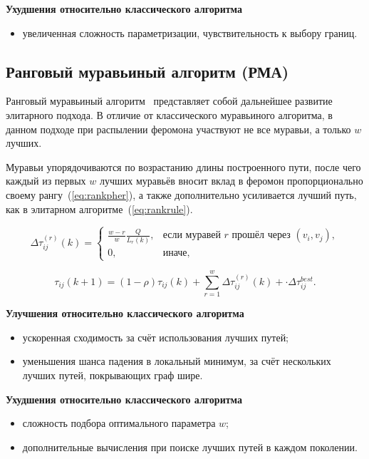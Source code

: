 \textbf{Ухудшения относительно классического алгоритма}

\begin{itemize}
	\item увеличенная сложность параметризации, чувствительность к выбору границ.
\end{itemize} 

\subsection*{Ранговый муравьиный алгоритм (РМА)}

Ранговый муравьиный алгоритм~\cite{rbas} представляет собой дальнейшее развитие элитарного подхода. В отличие от классического муравьиного алгоритма, в данном подходе при распылении феромона участвуют не все муравьи, а только $w$ лучших.

Муравьи упорядочиваются по возрастанию длины построенного пути, после чего каждый из первых $w$ лучших муравьёв вносит вклад в феромон пропорционально своему рангу~(\ref{eq:rankpher}), а также дополнительно усиливается лучший путь, как в элитарном алгоритме~(\ref{eq:rankrule}).

\begin{equation}
	\Delta \tau_{ij}^{(r)}(k) = 
	\begin{cases}
		\displaystyle \frac{w - r}{w}\frac{Q}{L_r(k)}, & \text{если муравей } r \text{ прошёл через } (v_i,v_j), \\
		0, & \text{иначе},
	\end{cases}
	\label{eq:rankpher}
\end{equation}
 
\begin{equation}
	\tau_{ij}(k+1)=(1 - \rho)\tau_{ij}(k) + \sum_{r=1}^{w} \Delta \tau_{ij}^{(r)}(k) + \cdot \Delta\tau_{ij}^{best}.
	\label{eq:rankrule}
\end{equation}

\textbf{Улучшения относительно классического алгоритма}

\begin{itemize}
	\item ускоренная сходимость за счёт использования лучших путей;
	\item уменьшения шанса падения в локальный минимум, за счёт нескольких лучших путей, покрывающих граф шире.
\end{itemize}

\textbf{Ухудшения относительно классического алгоритма}

\begin{itemize}
	\item сложность подбора оптимального параметра $w$;
	\item дополнительные вычисления при поиске лучших путей в каждом поколении.
\end{itemize} 

